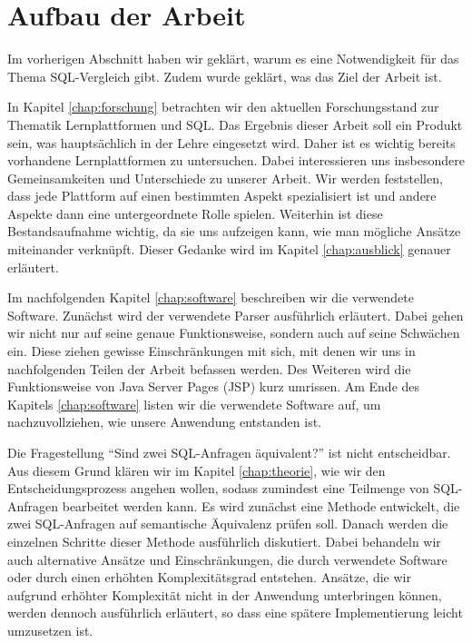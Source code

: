 \section{Aufbau der Arbeit}

Im vorherigen Abschnitt haben wir geklärt, warum es eine Notwendigkeit für das Thema SQL-Vergleich gibt. Zudem wurde geklärt, was das Ziel der Arbeit ist. 

In Kapitel \ref{chap:forschung} betrachten wir den aktuellen Forschungsstand zur Thematik Lernplattformen und SQL. Das Ergebnis dieser Arbeit soll ein Produkt sein, was hauptsächlich in der Lehre eingesetzt wird. Daher ist es wichtig bereits vorhandene Lernplattformen zu untersuchen. Dabei interessieren uns insbesondere Gemeinsamkeiten und Unterschiede zu unserer Arbeit. Wir werden feststellen, dass jede Plattform auf einen bestimmten Aspekt spezialisiert ist und andere Aspekte dann eine untergeordnete Rolle spielen. Weiterhin ist diese Bestandsaufnahme wichtig, da sie uns aufzeigen kann, wie man mögliche Ansätze miteinander verknüpft. Dieser Gedanke wird im Kapitel \ref{chap:ausblick} genauer erläutert.

Im nachfolgenden Kapitel \ref{chap:software} beschreiben wir die verwendete Software. Zunächst wird der verwendete Parser ausführlich erläutert. Dabei gehen wir nicht nur auf seine genaue Funktionsweise, sondern auch auf seine Schwächen ein. Diese ziehen gewisse Einschränkungen mit sich, mit denen wir uns in nachfolgenden Teilen der Arbeit befassen werden. Des Weiteren wird die Funktionsweise von Java Server Pages (JSP) kurz umrissen. Am Ende des Kapitels \ref{chap:software} listen wir die verwendete Software auf, um nachzuvollziehen, wie unsere Anwendung entstanden ist.

Die Fragestellung ``Sind zwei SQL-Anfragen äquivalent?'' ist nicht entscheidbar. Aus diesem Grund klären wir im Kapitel \ref{chap:theorie}, wie wir den Entscheidungsprozess angehen wollen, sodass zumindest eine Teilmenge von SQL-Anfragen bearbeitet werden kann. Es wird zunächst eine Methode entwickelt, die zwei SQL-Anfragen auf semantische Äquivalenz prüfen soll. Danach werden die einzelnen Schritte dieser Methode ausführlich diskutiert. Dabei behandeln wir auch alternative Ansätze und Einschränkungen, die durch verwendete Software oder durch einen erhöhten Komplexitätsgrad entstehen. Ansätze, die wir aufgrund erhöhter Komplexität nicht in der Anwendung unterbringen können, werden dennoch ausführlich erläutert, so dass eine spätere Implementierung leicht umzusetzen ist.

